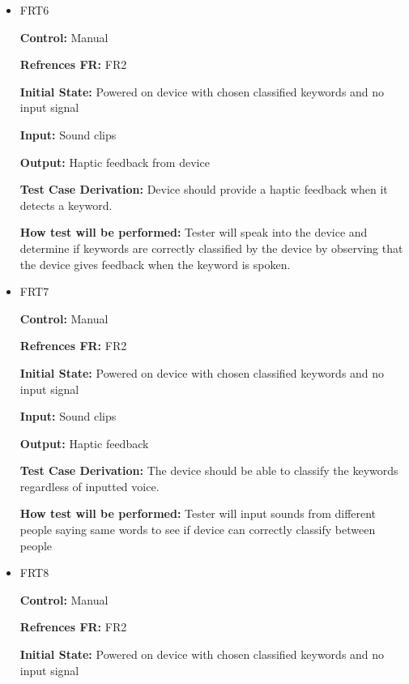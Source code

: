 \documentclass[12pt, titlepage]{article}
\begin{document}
\begin{itemize}

\item{FRT6}

\textbf{Control:} Manual

\textbf{Refrences FR:} FR2 					

\textbf{Initial State:} Powered on device with chosen classified keywords and no input signal 
					
\textbf{Input:} Sound clips
					
\textbf{Output:} Haptic feedback from device

\textbf{Test Case Derivation:} Device should provide a haptic feedback when it detects a keyword.
					
\textbf{How test will be performed:} Tester will speak into the device and determine if keywords are correctly classified by the device by observing that the device gives feedback when the keyword is spoken.


\item{FRT7}

\textbf{Control:} Manual

\textbf{Refrences FR:} FR2 					

\textbf{Initial State:} Powered on device with chosen classified keywords and no input signal 
					
\textbf{Input:} Sound clips
					
\textbf{Output:} Haptic feedback

\textbf{Test Case Derivation:} The device should be able to classify the keywords regardless of inputted voice.
					
\textbf{How test will be performed:} Tester will input sounds from different people saying same words to see if device can correctly classify between people 


\item{FRT8}

\textbf{Control:} Manual

\textbf{Refrences FR:} FR2 					

\textbf{Initial State:} Powered on device with chosen classified keywords and no input signal  
					

\end{itemize}
\end{document}
